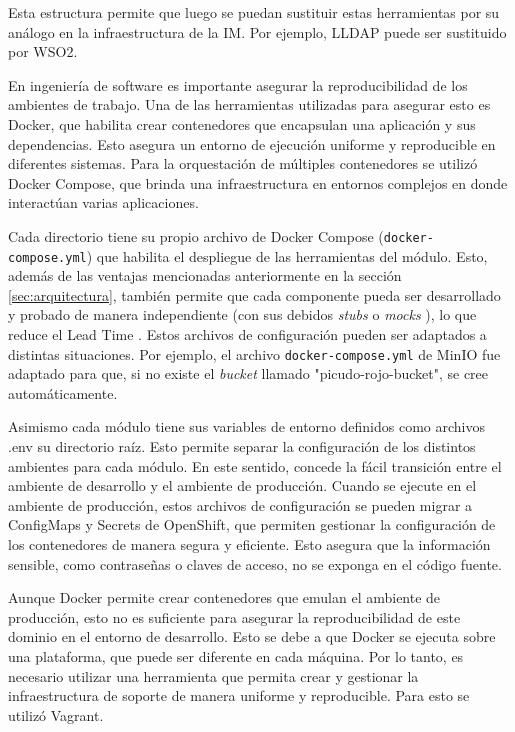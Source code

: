 Esta estructura permite que luego se puedan sustituir estas herramientas por su análogo en la infraestructura de la IM. Por ejemplo, LLDAP puede ser sustituido por WSO2.

En ingeniería de software es importante asegurar la reproducibilidad de los ambientes de trabajo. Una de las herramientas utilizadas para asegurar esto es Docker, que habilita crear contenedores que encapsulan una aplicación y sus dependencias. Esto asegura un entorno de ejecución uniforme y reproducible en diferentes sistemas. Para la orquestación de múltiples contenedores se utilizó Docker Compose, que brinda una infraestructura en entornos complejos en donde interactúan varias aplicaciones.

Cada directorio tiene su propio archivo de Docker Compose (\lstinline[language=sh]|docker-compose.yml|) que habilita el despliegue de las herramientas del módulo. Esto, además de las ventajas mencionadas anteriormente en la sección \ref{sec:arquitectura}, también permite que cada componente pueda ser desarrollado y probado de manera independiente (con sus debidos \textit{stubs} \citep{wikipedia_talon_2025} o \textit{mocks} \citep{wikipedia_objeto_2024}), lo que reduce el Lead Time \citep{wikipedia_lead_2025}. Estos archivos de configuración pueden ser adaptados a distintas situaciones. Por ejemplo, el archivo \lstinline[language=sh]|docker-compose.yml| de MinIO fue adaptado para que, si no existe el \textit{bucket} llamado "picudo-rojo-bucket", se cree automáticamente.

Asimismo cada módulo tiene sus variables de entorno definidos como archivos .env su directorio raíz. Esto permite separar la configuración de los distintos ambientes para cada módulo. En este sentido, concede la fácil transición entre el ambiente de desarrollo y el ambiente de producción. Cuando se ejecute en el ambiente de producción, estos archivos de configuración se pueden migrar a ConfigMaps \citep{red_hat_chapter_nodate} y Secrets \citep{red_hat_chapter_nodate-1} de OpenShift, que permiten gestionar la configuración de los contenedores de manera segura y eficiente. Esto asegura que la información sensible, como contraseñas o claves de acceso, no se exponga en el código fuente.

Aunque Docker permite crear contenedores que emulan el ambiente de producción, esto no es suficiente para asegurar la reproducibilidad de este dominio en el entorno de desarrollo. Esto se debe a que Docker se ejecuta sobre una plataforma, que puede ser diferente en cada máquina. Por lo tanto, es necesario utilizar una herramienta que permita crear y gestionar la infraestructura de soporte de manera uniforme y reproducible. Para esto se utilizó Vagrant.

